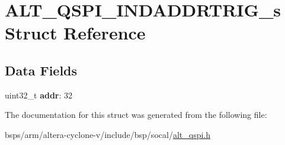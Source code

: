 \hypertarget{structALT__QSPI__INDADDRTRIG__s}{}\section{A\+L\+T\+\_\+\+Q\+S\+P\+I\+\_\+\+I\+N\+D\+A\+D\+D\+R\+T\+R\+I\+G\+\_\+s Struct Reference}
\label{structALT__QSPI__INDADDRTRIG__s}
\subsection*{Data Fields}
\begin{DoxyCompactItemize}
\item 
\mbox{\label{structALT__QSPI__INDADDRTRIG__s_acce572b363da3967679d75dea6751915}} 
uint32\+\_\+t {\bfseries addr}\+: 32
\end{DoxyCompactItemize}


The documentation for this struct was generated from the following file\+:\begin{DoxyCompactItemize}
\item 
bsps/arm/altera-\/cyclone-\/v/include/bsp/socal/\mbox{\hyperlink{include_2bsp_2socal_2alt__qspi_8h}{alt\+\_\+qspi.\+h}}\end{DoxyCompactItemize}
